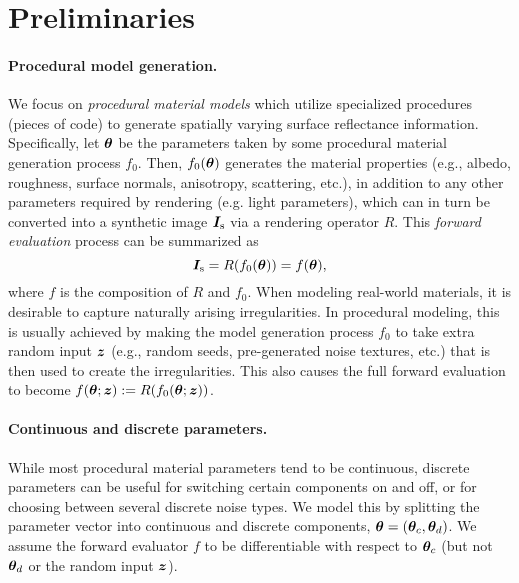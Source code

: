 \section{Preliminaries}
\label{sec:bayesian:prelim}

\paragraph{Procedural model generation.}
We focus on \emph{procedural material models} which utilize specialized procedures (pieces of code) to generate spatially varying surface reflectance information.
Specifically, let $\bm\theta$ be the parameters taken by some procedural material generation process $f_0$.
Then, $f_0(\bm\theta)$ generates the material properties (e.g., albedo, roughness, surface normals, anisotropy, scattering, etc.), in addition to any other parameters required by rendering (e.g. light parameters), which can in turn be converted into a synthetic image $\bm{I}_\mathrm{s}$ via a rendering operator $R$.
This \emph{forward evaluation} process can be summarized as
\begin{equation}
	\label{eq:forward}
	\bm{I}_\mathrm{s} = R(f_0(\bm\theta)) = f(\bm\theta),
\end{equation}
where $f$ is the composition of $R$ and $f_0$.
When modeling real-world materials, it is desirable to capture naturally arising irregularities.
In procedural modeling, this is usually achieved by making the model generation process $f_0$ to take extra random input $\bm{z}$ (e.g., random seeds, pre-generated noise textures, etc.) that is then used to create the irregularities.
This also causes the full forward evaluation to become $f(\bm\theta; \bm{z}) := R(f_0(\bm\theta; \bm{z}))$.

\paragraph{Continuous and discrete parameters.}
While most procedural material parameters tend to be continuous, discrete parameters can be useful for switching certain components on and off, or for choosing between several discrete noise types. We model this by splitting the parameter vector into continuous and discrete components, $\bm\theta = (\bm\theta_c, \bm\theta_d)$.
We assume the forward evaluator $f$ to be differentiable with respect to $\bm\theta_c$ (but not $\bm\theta_d$ or the random input $\bm{z}$).

